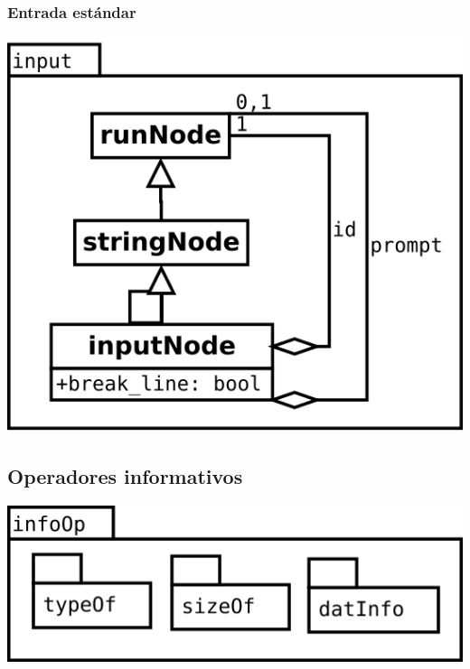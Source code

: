 \subsubsection {Entrada estándar} 
\begin{center}
\includegraphics[scale=0.4]{input.png} \\
\end{center}
\pagebreak
\subsection {Operadores informativos} 
\begin{center}
\includegraphics[scale=0.4]{infoOp-package.png} \\
\end{center}

